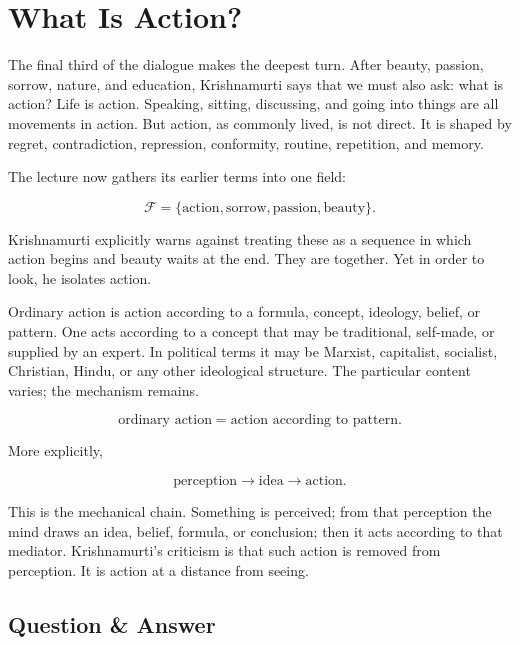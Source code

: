 \section{What Is Action?}

The final third of the dialogue makes the deepest turn. After beauty, passion, sorrow, nature, and education, Krishnamurti says that we must also ask: what is action? Life is action. Speaking, sitting, discussing, and going into things are all movements in action. But action, as commonly lived, is not direct. It is shaped by regret, contradiction, repression, conformity, routine, repetition, and memory.

The lecture now gathers its earlier terms into one field:

\begin{equation}
\mathcal{F}
=
\{\text{action},\text{sorrow},\text{passion},\text{beauty}\}.
\end{equation}

Krishnamurti explicitly warns against treating these as a sequence in which action begins and beauty waits at the end. They are together. Yet in order to look, he isolates action.

Ordinary action is action according to a formula, concept, ideology, belief, or pattern. One acts according to a concept that may be traditional, self-made, or supplied by an expert. In political terms it may be Marxist, capitalist, socialist, Christian, Hindu, or any other ideological structure. The particular content varies; the mechanism remains.

\begin{equation}
\text{ordinary action}
=
\text{action according to pattern}.
\end{equation}

More explicitly,

\begin{equation}
\text{perception}
\longrightarrow
\text{idea}
\longrightarrow
\text{action}.
\end{equation}

This is the mechanical chain. Something is perceived; from that perception the mind draws an idea, belief, formula, or conclusion; then it acts according to that mediator. Krishnamurti's criticism is that such action is removed from perception. It is action at a distance from seeing.

\subsection{Question \& Answer}

